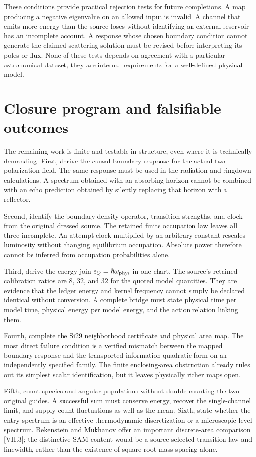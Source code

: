 These conditions provide practical rejection tests for future completions. A map producing a negative eigenvalue on an allowed input is invalid. A channel that emits more energy than the source loses without identifying an external reservoir has an incomplete account. A response whose chosen boundary condition cannot generate the claimed scattering solution must be revised before interpreting its poles or flux. None of these tests depends on agreement with a particular astronomical dataset; they are internal requirements for a well-defined physical model.

\section{Closure program and falsifiable outcomes}
The remaining work is finite and testable in structure, even where it is technically demanding. First, derive the causal boundary response for the actual two-polarization field. The same response must be used in the radiation and ringdown calculations. A spectrum obtained with an absorbing horizon cannot be combined with an echo prediction obtained by silently replacing that horizon with a reflector.

Second, identify the boundary density operator, transition strengths, and clock from the original dressed source. The retained finite occupation law leaves all three incomplete. An attempt clock multiplied by an arbitrary constant rescales luminosity without changing equilibrium occupation. Absolute power therefore cannot be inferred from occupation probabilities alone.

Third, derive the energy join $\varepsilon_Q=\hbar\omega_{\rm phys}$ in one chart. The source's retained calibration ratios are $8$, $32$, and $32$ for the quoted model quantities. They are evidence that the ledger energy and kernel frequency cannot simply be declared identical without conversion. A complete bridge must state physical time per model time, physical energy per model energy, and the action relation linking them.

Fourth, complete the Si29 neighborhood certificate and physical area map. The most direct failure condition is a verified mismatch between the mapped boundary response and the transported information quadratic form on an independently specified family. The finite enclosing-area obstruction already rules out its simplest scalar identification, but it leaves physically richer maps open.

Fifth, count species and angular populations without double-counting the two original guides. A successful sum must conserve energy, recover the single-channel limit, and supply count fluctuations as well as the mean. Sixth, state whether the entry spectrum is an effective thermodynamic discretization or a microscopic level spectrum. Bekenstein and Mukhanov offer an important discrete-area comparison [VII.3]; the distinctive SAM content would be a source-selected transition law and linewidth, rather than the existence of square-root mass spacing alone.

